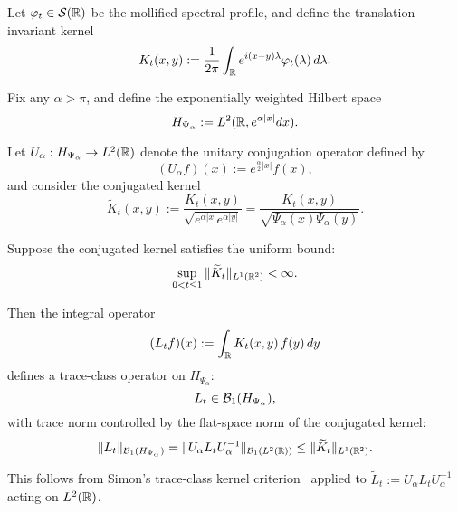 \begin{lemma}
\label{lem:trace_class_Lt}
Let \( \varphi_t \in \mathcal{S}(\mathbb{R}) \) be the mollified spectral profile, and define the translation-invariant kernel
\[
K_t(x, y) := \frac{1}{2\pi} \int_{\mathbb{R}} e^{i(x - y)\lambda} \varphi_t(\lambda)\, d\lambda.
\]

Fix any \( \alpha > \pi \), and define the exponentially weighted Hilbert space
\[
H_{\Psi_\alpha} := L^2(\mathbb{R}, e^{\alpha |x|} dx).
\]

Let \( U_\alpha : H_{\Psi_\alpha} \to L^2(\mathbb{R}) \) denote the unitary conjugation operator defined by
\[
(U_\alpha f)(x) := e^{\frac{\alpha}{2}|x|} f(x),
\]
and consider the conjugated kernel
\[
\widetilde{K}_t(x, y) := \frac{K_t(x, y)}{\sqrt{e^{\alpha |x|} e^{\alpha |y|}}} = \frac{K_t(x, y)}{\sqrt{\Psi_\alpha(x)\Psi_\alpha(y)}}.
\]

Suppose the conjugated kernel satisfies the uniform bound:
\[
\sup_{0 < t \le 1} \| \widetilde{K}_t \|_{L^1(\mathbb{R}^2)} < \infty.
\]

Then the integral operator
\[
(L_t f)(x) := \int_{\mathbb{R}} K_t(x, y)\, f(y)\, dy
\]
defines a trace-class operator on \( H_{\Psi_\alpha} \):
\[
L_t \in \mathcal{B}_1(H_{\Psi_\alpha}),
\]
with trace norm controlled by the flat-space norm of the conjugated kernel:
\[
\| L_t \|_{\mathcal{B}_1(H_{\Psi_\alpha})} = \| U_\alpha L_t U_\alpha^{-1} \|_{\mathcal{B}_1(L^2(\mathbb{R}))} \le \| \widetilde{K}_t \|_{L^1(\mathbb{R}^2)}.
\]

This follows from Simon’s trace-class kernel criterion~\cite[Thm.~4.2]{Simon2005TraceIdeals} applied to \( \widetilde{L}_t := U_\alpha L_t U_\alpha^{-1} \) acting on \( L^2(\mathbb{R}) \).
\end{lemma}
